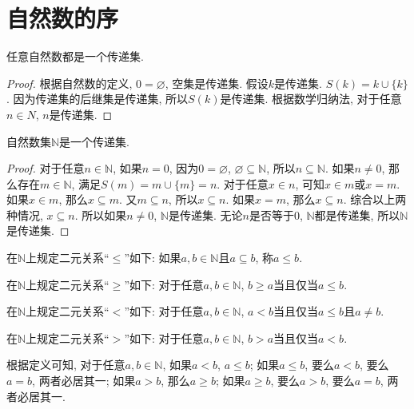 \section{自然数的序}
\begin{theorem}
	任意自然数都是一个传递集.
\end{theorem}

\begin{proof}
	根据自然数的定义, $0=\varnothing$, 空集是传递集. 假设$k$是传递集. $S(k)=k\cup \{k\}$. 因为传递集的后继集是传递集, 所以$S(k)$是传递集. 根据数学归纳法, 对于任意$n\in N$, $n$是传递集.
\end{proof}

\begin{theorem}
	自然数集$\mathbb N$是一个传递集.
\end{theorem}

\begin{proof}
	对于任意$n\in \mathbb N$, 如果$n=0$, 因为$0=\varnothing$, $\varnothing\subseteq \mathbb N$, 所以$n\subseteq \mathbb N$. 如果$n\neq 0$, 那么存在$m\in \mathbb N$, 满足$S(m)=m\cup \{m\}=n$. 对于任意$x\in n$, 可知$x\in m$或$x=m$. 如果$x\in m$, 那么$x\subseteq m$. 又$m\subseteq n$, 所以$x\subseteq n$. 如果$x=m$, 那么$x\subseteq n$. 综合以上两种情况, $x\subseteq n$. 所以如果$n\neq 0$, $\mathbb N$是传递集. 无论$n$是否等于$0$, $\mathbb N$都是传递集, 所以$\mathbb N$是传递集.
\end{proof}

\begin{definition}
	在$\mathbb N$上规定二元关系``$\leqslant$''如下: 如果$a,b\in \mathbb N$且$a\subseteq b$, 称$a\leqslant b$.
\end{definition}

\begin{definition}
	在$\mathbb N$上规定二元关系``$\geqslant$''如下: 对于任意$a,b\in \mathbb N$, $b\geqslant a$当且仅当$a\leqslant b$.
\end{definition}

\begin{definition}
	在$\mathbb N$上规定二元关系``$<$''如下: 对于任意$a,b\in \mathbb N$, $a<b$当且仅当$a\leqslant b$且$a\neq b$.
\end{definition}

\begin{definition}
	在$\mathbb N$上规定二元关系``$>$''如下: 对于任意$a,b\in \mathbb N$, $b>a$当且仅当$a<b$.
\end{definition}

根据定义可知, 对于任意$a,b\in \mathbb N$, 如果$a<b$, $a\leqslant b$; 如果$a\leqslant b$, 要么$a<b$, 要么$a=b$, 两者必居其一; 如果$a>b$, 那么$a\geqslant b$; 如果$a\geqslant b$, 要么$a>b$, 要么$a=b$, 两者必居其一.

